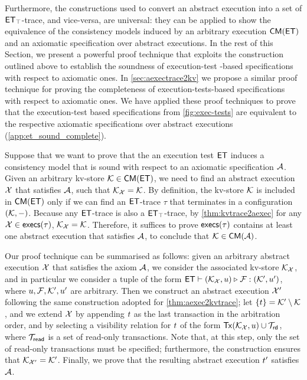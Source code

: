 Furthermore, the constructions used to convert an abstract execution 
into a  set of $\mathsf{ET}_{\top}$-trace, and vice-versa, are universal:  they can be applied to show the 
equivalence of  the consistency models induced by an arbitrary execution $\CMs(\ET)$ 
and an axiomatic specification over abstract executions. In the rest of this Section, 
we present a powerful proof technique that exploits the construction outlined 
above to establish the soundness of execution-test -based specifications with respect to axiomatic 
ones. In \cref{sec:aexectrace2kv} we propose a similar proof technique 
for proving the completeness of execution-tests-based specifications with respect to axiomatic ones. 
We have applied these proof techniques to prove that the execution-test 
based specifications from \cref{fig:exec-tests} are equivalent to the respective axiomatic specifications 
over abstract executions (\cref{app:et_sound_complete}).


Suppose that we want to prove that the an execution test $\mathsf{ET}$ induces a consistency model that is sound with respect 
to an axiomatic specification $\mathcal{A}$. Given an arbitrary kv-store $\hh \in \CMs(\ET)$, 
we need to find an abstract execution $\mathcal{X}$ that satisfies $\mathcal{A}$, such that $\mathcal{K}_{\mathcal{X}} = \mathcal{K}$.
By definition, the kv-store $\mathcal{K}$ is included in $\CMs(\ET)$ only 
if we can find an $\mathsf{ET}$-trace $\tau$ that terminates in a configuration $(\mathcal{K}, -)$. Because 
any $\mathsf{ET}$-trace is also a $\mathsf{ET}_{\top}$-trace, by \cref{thm:kvtrace2aexec} 
for any $\aexec \in \execs(\tau)$, $\mathcal{K}_{\mathcal{X}} = \mathcal{K}$. Therefore, it suffices to prove 
$\execs(\tau)$ contains at least one abstract execution that satisfies $\mathcal{A}$, to conclude 
that $\hh \in \CMs(\Ax)$. 

Our proof technique can be summarised as follows: given an arbitrary abstract execution $\mathcal{X}$ 
that satisfies the axiom $\mathcal{A}$, we consider the associated kv-store $\mathcal{K}_{\mathcal{X}}$, and in particular 
we consider a tuple of the form $\mathsf{ET} \vdash (\mathcal{K}_{\mathcal{X}}, u) \triangleright_{} \mathcal{F}: (\mathcal{K}', u')$, 
where $u, \mathcal{F}, \mathcal{K}', u'$ are arbitrary. Then we construct an abstract execution 
$\mathcal{X}'$ following the same construction adopted for \cref{thm:aexec2kvtrace}; 
let $\{t\} = \mathcal{K}' \setminus \mathcal{K}$, and we extend $\mathcal{X}$ by appending $t$ 
as the last transaction in the arbitration order, and by selecting a visibility relation for $t$ 
of the form $\Tx(\hh_{\aexec}, \vi) \cup \T_{\mathsf{rd}}$, where $\mathcal{T}_{\mathsf{read}}$ is a 
set of read-only transactions. Note that, at this step, only the set of read-only transactions 
must be specified; furthermore, the construction ensures that $\mathcal{K}_{\mathcal{X}'} = \mathcal{K}'$. 
Finally, we prove that the resulting abstract execution $t'$ satisfies $\mathcal{A}$. 

